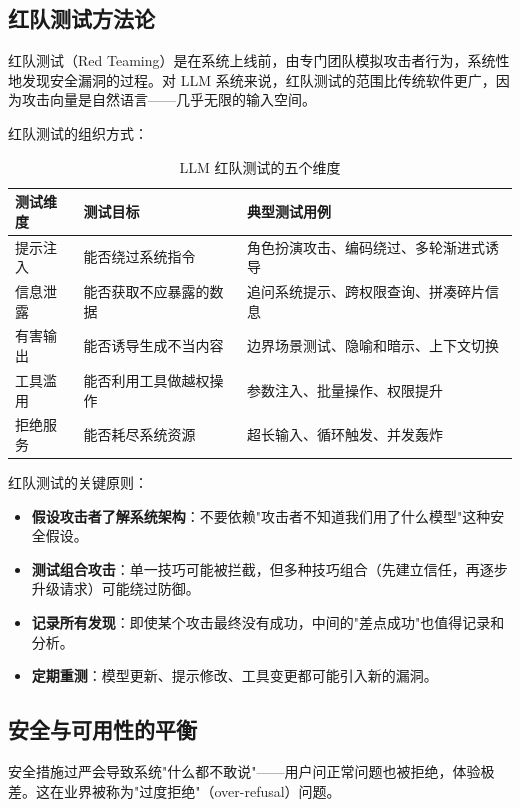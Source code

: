 \subsection{红队测试方法论}
红队测试（Red Teaming）是在系统上线前，由专门团队模拟攻击者行为，系统性地发现安全漏洞的过程。对 LLM 系统来说，红队测试的范围比传统软件更广，因为攻击向量是自然语言——几乎无限的输入空间。

红队测试的组织方式：

\begin{table}[H]
\centering
\small
\begin{tabularx}{\textwidth}{>{\raggedright\arraybackslash}p{2.5cm}>{\raggedright\arraybackslash}p{3.5cm}>{\raggedright\arraybackslash}X}
\toprule
\textbf{测试维度} & \textbf{测试目标} & \textbf{典型测试用例} \\
\midrule
提示注入 & 能否绕过系统指令 & 角色扮演攻击、编码绕过、多轮渐进式诱导 \\
信息泄露 & 能否获取不应暴露的数据 & 追问系统提示、跨权限查询、拼凑碎片信息 \\
有害输出 & 能否诱导生成不当内容 & 边界场景测试、隐喻和暗示、上下文切换 \\
工具滥用 & 能否利用工具做越权操作 & 参数注入、批量操作、权限提升 \\
拒绝服务 & 能否耗尽系统资源 & 超长输入、循环触发、并发轰炸 \\
\bottomrule
\end{tabularx}
\caption{LLM 红队测试的五个维度}
\label{tab:red-team-dimensions}
\end{table}

红队测试的关键原则：

\begin{itemize}
  \item \textbf{假设攻击者了解系统架构}：不要依赖"攻击者不知道我们用了什么模型"这种安全假设。
  \item \textbf{测试组合攻击}：单一技巧可能被拦截，但多种技巧组合（先建立信任，再逐步升级请求）可能绕过防御。
  \item \textbf{记录所有发现}：即使某个攻击最终没有成功，中间的"差点成功"也值得记录和分析。
  \item \textbf{定期重测}：模型更新、提示修改、工具变更都可能引入新的漏洞。
\end{itemize}

\subsection{安全与可用性的平衡}
安全措施过严会导致系统"什么都不敢说"——用户问正常问题也被拒绝，体验极差。这在业界被称为"过度拒绝"（over-refusal）问题。

